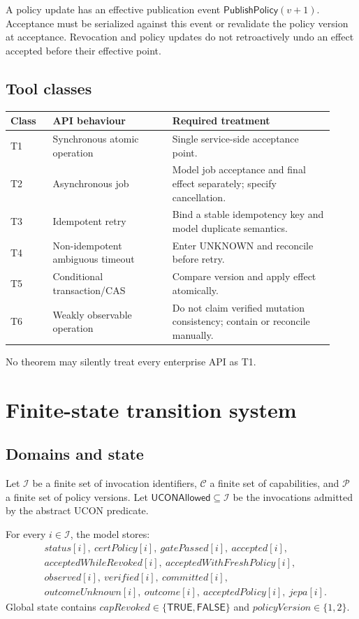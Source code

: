 \documentclass[11pt,a4paper]{article}
\theoremstyle{remark}
\newcommand{\UCONInv}{\mathcal I}
\newcommand{\UCONCap}{\mathcal C}
\newcommand{\UCONPol}{\mathcal P}
\newcommand{\UCONAllowed}{\mathsf{UCONAllowed}}
\newcommand{\UCONTrue}{\mathsf{TRUE}}
\newcommand{\UCONFalse}{\mathsf{FALSE}}
\begin{document}
A policy update has an effective publication event $\mathsf{PublishPolicy}(v+1)$. Acceptance must be serialized against this event or revalidate the policy version at acceptance. Revocation and policy updates do not retroactively undo an effect accepted before their effective point.

\subsection{Tool classes}

\begin{longtable}{p{0.12\linewidth}p{0.34\linewidth}p{0.46\linewidth}}
\toprule
Class & API behaviour & Required treatment\\
\midrule
T1 & Synchronous atomic operation & Single service-side acceptance point.\\
T2 & Asynchronous job & Model job acceptance and final effect separately; specify cancellation.\\
T3 & Idempotent retry & Bind a stable idempotency key and model duplicate semantics.\\
T4 & Non-idempotent ambiguous timeout & Enter UNKNOWN and reconcile before retry.\\
T5 & Conditional transaction/CAS & Compare version and apply effect atomically.\\
T6 & Weakly observable operation & Do not claim verified mutation consistency; contain or reconcile manually.\\
\bottomrule
\end{longtable}

No theorem may silently treat every enterprise API as T1.

\section{Finite-state transition system}

\subsection{Domains and state}

Let $\UCONInv$ be a finite set of invocation identifiers, $\UCONCap$ a finite set of capabilities, and $\UCONPol$ a finite set of policy versions. Let $\UCONAllowed\subseteq\UCONInv$ be the invocations admitted by the abstract UCON predicate.

For every $i\in\UCONInv$, the model stores:
\[
\begin{split}
&status[i],\ certPolicy[i],\ gatePassed[i],\ accepted[i],\\
&acceptedWhileRevoked[i],\ acceptedWithFreshPolicy[i],\\
&observed[i],\ verified[i],\ committed[i],\\
&outcomeUnknown[i],\ outcome[i],\ acceptedPolicy[i],\ jepa[i].
\end{split}
\]
Global state contains $capRevoked\in\{\UCONTrue,\UCONFalse\}$ and $policyVersion\in\{1,2\}$.
\end{document}
